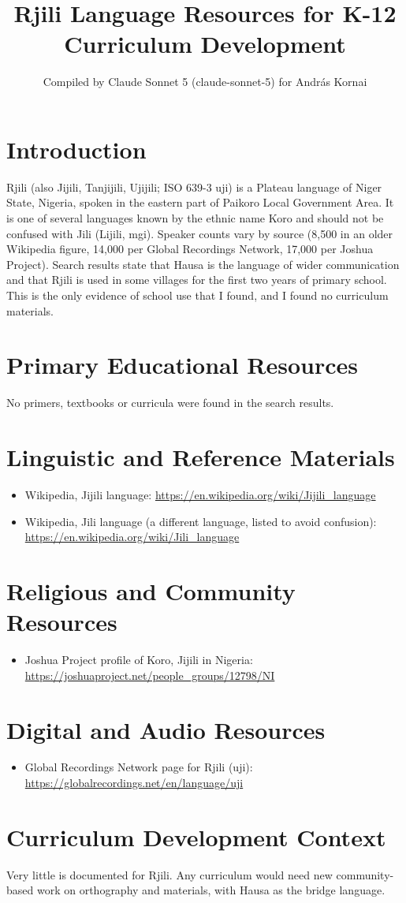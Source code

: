 \documentclass[12pt]{article}
\title{Rjili Language Resources for K-12 Curriculum Development}
\author{Compiled by Claude Sonnet 5 (claude-sonnet-5) for Andr\'as Kornai}
\date{}
\begin{document}
\maketitle
\section{Introduction}
Rjili (also Jijili, Tanjijili, Ujijili; ISO 639-3 uji) is a Plateau language of Niger State, Nigeria, spoken in the eastern part of Paikoro Local Government Area. It is one of several languages known by the ethnic name Koro and should not be confused with Jili (Lijili, mgi). Speaker counts vary by source (8,500 in an older Wikipedia figure, 14,000 per Global Recordings Network, 17,000 per Joshua Project). Search results state that Hausa is the language of wider communication and that Rjili is used in some villages for the first two years of primary school. This is the only evidence of school use that I found, and I found no curriculum materials.
\section{Primary Educational Resources}
No primers, textbooks or curricula were found in the search results.
\section{Linguistic and Reference Materials}
\begin{itemize}
\item Wikipedia, Jijili language: \url{https://en.wikipedia.org/wiki/Jijili_language}
\item Wikipedia, Jili language (a different language, listed to avoid confusion): \url{https://en.wikipedia.org/wiki/Jili_language}
\end{itemize}
\section{Religious and Community Resources}
\begin{itemize}
\item Joshua Project profile of Koro, Jijili in Nigeria: \url{https://joshuaproject.net/people_groups/12798/NI}
\end{itemize}
\section{Digital and Audio Resources}
\begin{itemize}
\item Global Recordings Network page for Rjili (uji): \url{https://globalrecordings.net/en/language/uji}
\end{itemize}
\section{Curriculum Development Context}
Very little is documented for Rjili. Any curriculum would need new community-based work on orthography and materials, with Hausa as the bridge language.
\end{document}
